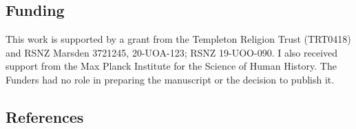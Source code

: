 \documentclass[
  single column]{article}
\begin{document}
\newpage{}

\subsection{Funding}\label{funding}

This work is supported by a grant from the Templeton Religion Trust
(TRT0418) and RSNZ Marsden 3721245, 20-UOA-123; RSNZ 19-UOO-090. I also
received support from the Max Planck Institute for the Science of Human
History. The Funders had no role in preparing the manuscript or the
decision to publish it.

\newpage{}

\subsection{References}\label{references}
\end{document}
